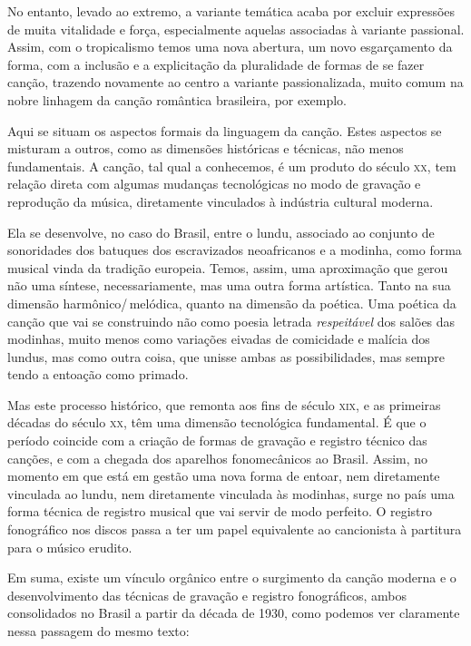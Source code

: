 No entanto, levado ao extremo, a variante temática acaba por excluir
expressões de muita vitalidade e força, especialmente aquelas associadas
à variante passional. Assim, com o tropicalismo temos uma nova abertura,
um novo esgarçamento da forma, com a inclusão e a explicitação da
pluralidade de formas de se fazer canção, trazendo novamente ao centro a
variante passionalizada, muito comum na nobre linhagem da canção
romântica brasileira, por exemplo.

Aqui se situam os aspectos formais da linguagem da canção. Estes
aspectos se misturam a outros, como as dimensões históricas e técnicas,
não menos fundamentais. A canção, tal qual a conhecemos, é um produto do
século \textsc{xx}, tem relação direta com algumas mudanças tecnológicas no modo
de gravação e reprodução da música, diretamente vinculados à indústria
cultural moderna.

Ela se desenvolve, no caso do Brasil, entre o lundu, associado ao
conjunto de sonoridades dos batuques dos escravizados neoafricanos e a
modinha, como forma musical vinda da tradição europeia. Temos, assim,
uma aproximação que gerou não uma síntese, necessariamente, mas uma
outra forma artística. Tanto na sua dimensão harmônico/\,melódica, quanto
na dimensão da poética. Uma poética da canção que vai se construindo não
como poesia letrada \textit{respeitável} dos salões das modinhas, muito menos
como variações eivadas de comicidade e malícia dos lundus, mas como
outra coisa, que unisse ambas as possibilidades, mas sempre tendo a
entoação como primado.

Mas este processo histórico, que remonta aos fins de século \textsc{xix}, e as
primeiras décadas do século \textsc{xx}, têm uma dimensão tecnológica
fundamental. É que o período coincide com a criação de formas de
gravação e registro técnico das canções, e com a chegada dos aparelhos
fonomecânicos ao Brasil. Assim, no momento em que está em gestão uma
nova forma de entoar, nem diretamente vinculada ao lundu, nem
diretamente vinculada às modinhas, surge no país uma forma técnica de
registro musical que vai servir de modo perfeito. O registro fonográfico
nos discos passa a ter um papel equivalente ao cancionista à partitura
para o músico erudito.

Em suma, existe um vínculo orgânico entre o surgimento da canção moderna
e o desenvolvimento das técnicas de gravação e registro fonográficos,
ambos consolidados no Brasil a partir da década de 1930, como podemos ver
claramente nessa passagem do mesmo texto:

